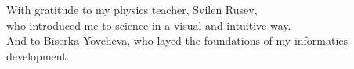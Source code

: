 \thispagestyle{empty}
{}

\vspace*{3cm}

\begin{center}
    With gratitude to my physics teacher, Svilen Rusev,\\
    who introduced me to science in a visual and intuitive way.\\
    And to Biserka Yovcheva, who layed the foundations of my informatics
    development.
\end{center}

\medskip
